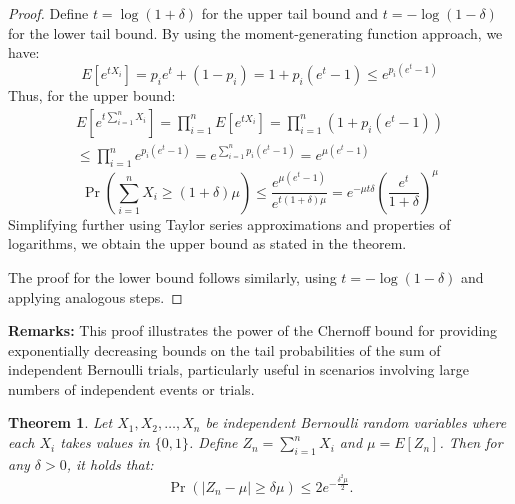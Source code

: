 \documentclass[11pt]{book} %
\newtheorem{theorem}{Theorem}[section]
\begin{document}
\begin{proof}
    Define \( t = \log(1 + \delta) \) for the upper tail bound and \( t = -\log(1 - \delta) \) for the lower tail bound. By using the moment-generating function approach, we have:
    \begin{equation}
        E[e^{tX_i}] = p_i e^t + (1 - p_i) = 1 + p_i(e^t - 1) \leq e^{p_i(e^t - 1)}
    \end{equation}
    Thus, for the upper bound:
    \begin{equation}
        \begin{aligned}
            E\left[e^{t\sum_{i=1}^n X_i}\right] = \prod_{i=1}^n E[e^{tX_i}] = \prod_{i=1}^n \left(1 + p_i(e^t - 1)\right) \\
            \leq \prod_{i=1}^n e^{p_i(e^t - 1)} = e^{\sum_{i=1}^n p_i(e^t - 1)} = e^{\mu (e^t - 1)} 
        \end{aligned}
    \end{equation}
    \begin{equation}
        \Pr\left(\sum_{i=1}^n X_i \geq (1+\delta)\mu\right) \leq \frac{e^{\mu(e^t - 1)}}{e^{t(1+\delta)\mu}} = e^{-\mu t \delta} \left(\frac{e^t}{1+\delta}\right)^\mu
    \end{equation}
    Simplifying further using Taylor series approximations and properties of logarithms, we obtain the upper bound as stated in the theorem.

    The proof for the lower bound follows similarly, using \( t = -\log(1 - \delta) \) and applying analogous steps.
\end{proof}

\textbf{Remarks:}
This proof illustrates the power of the Chernoff bound for providing exponentially decreasing bounds on the tail probabilities of the sum of independent Bernoulli trials, particularly useful in scenarios involving large numbers of independent events or trials.


\begin{boxA}
    \begin{theorem}
        Let \(X_1, X_2, \ldots, X_n\) be independent Bernoulli random variables where each \(X_i\) takes values in \(\{0, 1\}\). Define \(Z_n = \sum_{i=1}^n X_i\) and \(\mu = E[Z_n]\). Then for any \(\delta > 0\), it holds that:
        \begin{equation}
            \Pr(|Z_n - \mu| \geq \delta \mu) \leq 2 e^{-\frac{\delta^2 \mu}{2}}.
        \end{equation}
    \end{theorem}    
\end{boxA}
\end{document}
